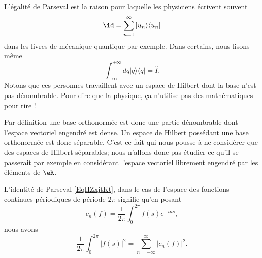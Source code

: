 \begin{remark}
    L'égalité de Parseval est la raison pour laquelle les physiciens écrivent souvent
    \begin{equation}
        \id=\sum_{n=1}^{\infty}|u_n\rangle\langle u_n|
    \end{equation}
    dans les livres de mécanique quantique par exemple. Dans certains, nous lisons même 
    \begin{equation}
        \int_{-\infty}^{+\infty}dq|q\rangle\langle q| =\hat I.
    \end{equation}
    Notons que ces personnes travaillent avec un espace de Hilbert dont la base n'est pas dénombrable. Pour dire que la physique, ça n'utilise pas des mathématiques pour rire !
\end{remark}

\begin{remark}
    Par définition une base orthonormée est donc une partie dénombrable dont l'espace vectoriel engendré est dense. Un espace de Hilbert possédant une base orthonormée est donc séparable. C'est ce fait qui nous pousse à ne considérer que des espaces de Hilbert séparables; nous n'allons donc pas étudier ce qu'il se passerait par exemple en considérant l'espace vectoriel librement engendré par les éléments de \( \eR\).
\end{remark}

\begin{example}
    L'identité de Parseval \eqref{EqHZxjtKt}, dans le cas de l'espace des fonctions continues périodiques de période \( 2\pi\) signifie qu'en posant 
    \begin{equation}
        c_n(f)=\frac{1}{ 2\pi }\int_0^{2\pi}f(s) e^{-ins},
    \end{equation}
    nous avons
    \begin{equation}    \label{EqMIuCSfz}
        \frac{1}{ 2\pi }\int_0^{2\pi}| f(s) |^2=\sum_{n=-\infty}^{\infty}| c_n(f) |^2.
    \end{equation}
\end{example}

